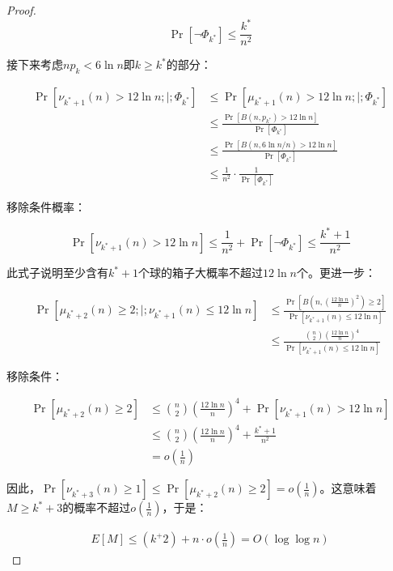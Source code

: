 \documentclass[lang=cn,newtx,10pt,scheme=chinese,chinesefont=nofont,citestyle=gb7714-2015, bibstyle=gb7714-2015]{elegantbook}
\begin{document}
\begin{refsection}
\begin{proof}
\begin{equation}
\Pr[\neg\Phi_{k^*}] \le \frac{k^*}{n^2}
\end{equation}

接下来考虑$np_k < 6\ln n$即$k\ge k^*$的部分：

\begin{align}
\Pr[\nu_{k^*+1}(n) > 12\ln n ;|; \Phi_{k^*}] &\le \Pr[\mu_{k^*+1}(n)>12\ln n ;|;\Phi_{k^*}] \\
&\le \frac{\Pr[B(n, p_{k^*})>12\ln n]}{\Pr[\Phi_{k^*}]} \\
&\le \frac{\Pr[B(n, 6\ln n/n) > 12\ln n]}{\Pr[\Phi_{k^*}]} \\
&\le \frac{1}{n^2}\cdot\frac{1}{\Pr[\Phi_{k^*}]}
\end{align}

移除条件概率：

\begin{equation}
\Pr[\nu_{k^*+1}(n)>12\ln n] \le \frac{1}{n^2}+\Pr[\neg \Phi_{k^*}] \le \frac{k^*+1}{n^2}
\end{equation}

此式子说明至少含有$k^*+1$个球的箱子大概率不超过$12\ln n$个。更进一步：

\begin{align}
\Pr[\mu_{k^*+2}(n) \ge 2;|; \nu_{k^*+1}(n)\le 12\ln n] &\le \frac{\Pr[B(n, (\frac{12\ln n}{n})^2) \ge 2]}{\Pr[\nu_{k^*+1}(n)\le 12\ln n]} \\
&\le \frac{{\binom{n}{2}}(\frac{12\ln n}{n})^4}{\Pr[\nu_{k^*+1}(n)\le 12\ln n]}
\end{align}

移除条件：

\begin{align}
\Pr[\mu_{k^*+2}(n)\ge 2] &\le {\binom{n}{2}}\left(\frac{12\ln n}{n}\right)^4 + \Pr[\nu_{k^*+1}(n)>12\ln n] \\
&\le {\binom{n}{2}}\left(\frac{12\ln n}{n}\right)^4 + \frac{k^*+1}{n^2} \\
&= o\left(\frac{1}{n}\right)
\end{align}

因此，$\Pr[\nu_{k^*+3}(n)\ge1]\le\Pr[\mu_{k^*+2}(n)\ge2]=o(\frac{1}{n})$。这意味着$M\ge k^*+3$的概率不超过$o(\frac{1}{n})$，于是：

\begin{align}
E[M] \le (k^+2) + n\cdot o\left(\frac{1}{n}\right) = O(\log\log n)
\end{align}

\end{proof}


\end{refsection}
\end{document}
